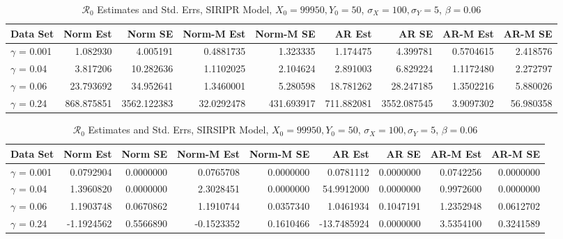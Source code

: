 \documentclass[12pt]{article}
\newcommand{\rr}{\ensuremath{\mathcal{R}_0}}
\begin{document}
\begin{table}[H]
	
	\caption{\label{tab:}$\rr$ Estimates and Std. Errs, SIRIPR Model,
		$X_0 = 99950, Y_0 = 50$, $\sigma_X = 100, \sigma_Y = 5$, $\beta = 0.06$}
	\centering
	\begin{footnotesize}
	\begin{tabular}[t]{l|r|r|r|r|r|r|r|r}
		\hline
		Data Set & Norm Est & Norm SE & Norm-M Est & Norm-M SE & AR Est & AR SE & AR-M Est & AR-M SE\\
		\hline
		$\gamma$ = 0.001 & 1.082930 & 4.005191 & 0.4881735 & 1.323335 & 1.174475 & 4.399781 & 0.5704615 & 2.418576\\
		\hline
		$\gamma$ = 0.04 & 3.817206 & 10.282636 & 1.1102025 & 2.104624 & 2.891003 & 6.829224 & 1.1172480 & 2.272797\\
		\hline
		$\gamma$ = 0.06 & 23.793692 & 34.952641 & 1.3460001 & 5.280598 & 18.781262 & 28.247185 & 1.3502216 & 5.880026\\
		\hline
		$\gamma$ = 0.24 & 868.875851 & 3562.122383 & 32.0292478 & 431.693917 & 711.882081 & 3552.087545 & 3.9097302 & 56.980358\\
		\hline
	\end{tabular}
\end{footnotesize}
\end{table}
\begin{table}[H]
	
	\caption{\label{tab:}$\rr$ Estimates and Std. Errs, SIRSIPR Model,
		$X_0 = 99950, Y_0 = 50$, $\sigma_X = 100, \sigma_Y = 5$, $\beta = 0.06$}
	\centering
	\begin{footnotesize}
	\begin{tabular}[t]{l|r|r|r|r|r|r|r|r}
		\hline
		Data Set & Norm Est & Norm SE & Norm-M Est & Norm-M SE & AR Est & AR SE & AR-M Est & AR-M SE\\
		\hline
		$\gamma$ = 0.001 & 0.0792904 & 0.0000000 & 0.0765708 & 0.0000000 & 0.0781112 & 0.0000000 & 0.0742256 & 0.0000000\\
		\hline
		$\gamma$ = 0.04 & 1.3960820 & 0.0000000 & 2.3028451 & 0.0000000 & 54.9912000 & 0.0000000 & 0.9972600 & 0.0000000\\
		\hline
		$\gamma$ = 0.06 & 1.1903748 & 0.0670862 & 1.1910744 & 0.0357340 & 1.0461934 & 0.1047191 & 1.2352948 & 0.0612702\\
		\hline
		$\gamma$ = 0.24 & -1.1924562 & 0.5566890 & -0.1523352 & 0.1610466 & -13.7485924 & 0.0000000 & 3.5354100 & 0.3241589\\
		\hline
	\end{tabular}
\end{footnotesize}
\end{table}
\end{document}
